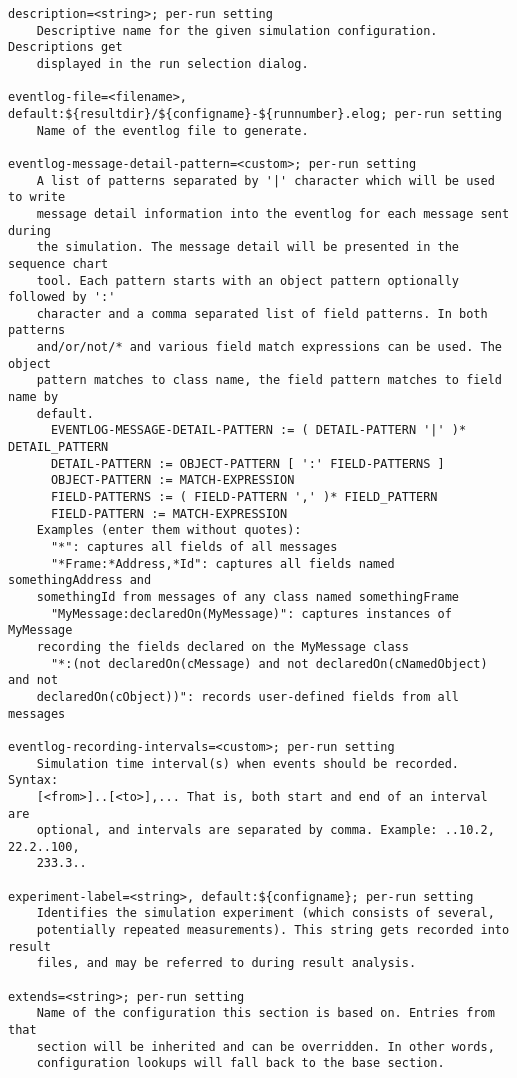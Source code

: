 \begin{verbatim}
description=<string>; per-run setting
    Descriptive name for the given simulation configuration. Descriptions get
    displayed in the run selection dialog.

eventlog-file=<filename>, default:${resultdir}/${configname}-${runnumber}.elog; per-run setting
    Name of the eventlog file to generate.

eventlog-message-detail-pattern=<custom>; per-run setting
    A list of patterns separated by '|' character which will be used to write
    message detail information into the eventlog for each message sent during
    the simulation. The message detail will be presented in the sequence chart
    tool. Each pattern starts with an object pattern optionally followed by ':'
    character and a comma separated list of field patterns. In both patterns
    and/or/not/* and various field match expressions can be used. The object
    pattern matches to class name, the field pattern matches to field name by
    default.
      EVENTLOG-MESSAGE-DETAIL-PATTERN := ( DETAIL-PATTERN '|' )* DETAIL_PATTERN
      DETAIL-PATTERN := OBJECT-PATTERN [ ':' FIELD-PATTERNS ]
      OBJECT-PATTERN := MATCH-EXPRESSION
      FIELD-PATTERNS := ( FIELD-PATTERN ',' )* FIELD_PATTERN
      FIELD-PATTERN := MATCH-EXPRESSION
    Examples (enter them without quotes):
      "*": captures all fields of all messages
      "*Frame:*Address,*Id": captures all fields named somethingAddress and
    somethingId from messages of any class named somethingFrame
      "MyMessage:declaredOn(MyMessage)": captures instances of MyMessage
    recording the fields declared on the MyMessage class
      "*:(not declaredOn(cMessage) and not declaredOn(cNamedObject) and not
    declaredOn(cObject))": records user-defined fields from all messages

eventlog-recording-intervals=<custom>; per-run setting
    Simulation time interval(s) when events should be recorded. Syntax:
    [<from>]..[<to>],... That is, both start and end of an interval are
    optional, and intervals are separated by comma. Example: ..10.2, 22.2..100,
    233.3..

experiment-label=<string>, default:${configname}; per-run setting
    Identifies the simulation experiment (which consists of several,
    potentially repeated measurements). This string gets recorded into result
    files, and may be referred to during result analysis.

extends=<string>; per-run setting
    Name of the configuration this section is based on. Entries from that
    section will be inherited and can be overridden. In other words,
    configuration lookups will fall back to the base section.


\end{verbatim}
